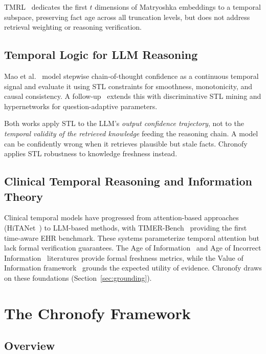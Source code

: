 \documentclass[conference]{IEEEtran}
\begin{document}
TMRL~\cite{huynh2026tmrl} dedicates the first $t$ dimensions of Matryoshka embeddings to a temporal subspace, preserving fact age across all truncation levels, but does not address retrieval weighting or reasoning verification.

\subsection{Temporal Logic for LLM Reasoning}

Mao et al.~\cite{mao2025stl} model stepwise chain-of-thought confidence as a continuous temporal signal and evaluate it using STL constraints for smoothness, monotonicity, and causal consistency. A follow-up~\cite{confidenceovertime2026} extends this with discriminative STL mining and hypernetworks for question-adaptive parameters.

Both works apply STL to the LLM's \emph{output confidence trajectory}, not to the \emph{temporal validity of the retrieved knowledge} feeding the reasoning chain. A model can be confidently wrong when it retrieves plausible but stale facts. Chronofy applies STL robustness to knowledge freshness instead.

\subsection{Clinical Temporal Reasoning and Information Theory}

Clinical temporal models have progressed from attention-based approaches (HiTANet~\cite{hitanet2020}) to LLM-based methods, with TIMER-Bench~\cite{timerbench2025} providing the first time-aware EHR benchmark. These systems parameterize temporal attention but lack formal verification guarantees. The Age of Information~\cite{kosta2020cost} and Age of Incorrect Information~\cite{maatouk2020aoii} literatures provide formal freshness metrics, while the Value of Information framework~\cite{raiffa1961applied, howard1966value} grounds the expected utility of evidence. Chronofy draws on these foundations (Section~\ref{sec:grounding}).

\section{The Chronofy Framework}

\subsection{Overview}
\end{document}
